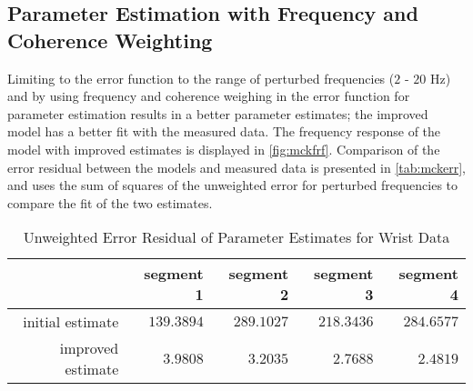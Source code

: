 \documentclass[11pt,a4paper]{article}
\begin{document}
\subsection{Parameter Estimation with Frequency and Coherence Weighting}
Limiting to the error function to the range of perturbed frequencies ($2$ -
$20$ Hz) and by using frequency and coherence weighing in the error function
for parameter estimation results in a better parameter estimates; the improved
model has a better fit with the measured data. The frequency response of the
model with improved estimates is displayed in \autoref{fig:mckfrf}. Comparison
of the error residual between the models and measured data is presented in
\autoref{tab:mckerr}, and uses the sum of squares of the unweighted error for
perturbed frequencies to compare the fit of the two estimates.

\begin{table}[hb]
    \centering
    \begin{tabular}{|r|r|r|r|r|}
        \hline
        \nonumber & segment 1 & segment 2 & segment 3 & segment 4 \\
        \hline
        initial estimate & $139.3894$ & $289.1027$ & $218.3436$ & $284.6577$ \\
        improved estimate & $3.9808$ & $3.2035$ & $2.7688$ & $2.4819$ \\
        \hline
    \end{tabular}
    \caption{Unweighted Error Residual of Parameter Estimates for Wrist Data}
    \label{tab:mckerr}
\end{table}

\end{document}
